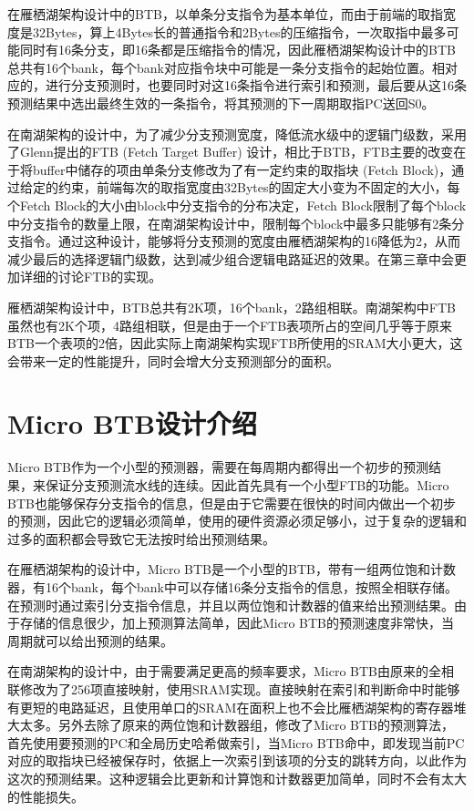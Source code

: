 在雁栖湖架构设计中的BTB，以单条分支指令为基本单位，而由于前端的取指宽度是32Bytes，算上4Bytes长的普通指令和2Bytes的压缩指令，一次取指中最多可能同时有16条分支，即16条都是压缩指令的情况，因此雁栖湖架构设计中的BTB总共有16个bank，每个bank对应指令块中可能是一条分支指令的起始位置。相对应的，进行分支预测时，也要同时对这16条指令进行索引和预测，最后要从这16条预测结果中选出最终生效的一条指令，将其预测的下一周期取指PC送回S0。

在南湖架构的设计中，为了减少分支预测宽度，降低流水级中的逻辑门级数，采用了Glenn提出的FTB (Fetch Target Buffer) 设计\cite{scalable-frontend}，相比于BTB，FTB主要的改变在于将buffer中储存的项由单条分支修改为了有一定约束的取指块 (Fetch Block)，通过给定的约束，前端每次的取指宽度由32Bytes的固定大小变为不固定的大小，每个Fetch Block的大小由block中分支指令的分布决定，Fetch Block限制了每个block中分支指令的数量上限，在南湖架构设计中，限制每个block中最多只能够有2条分支指令。通过这种设计，能够将分支预测的宽度由雁栖湖架构的16降低为2，从而减少最后的选择逻辑门级数，达到减少组合逻辑电路延迟的效果。在第三章中会更加详细的讨论FTB的实现。

雁栖湖架构设计中，BTB总共有2K项，16个bank，2路组相联。南湖架构中FTB虽然也有2K个项，4路组相联，但是由于一个FTB表项所占的空间几乎等于原来BTB一个表项的2倍，因此实际上南湖架构实现FTB所使用的SRAM大小更大，这会带来一定的性能提升，同时会增大分支预测部分的面积。

\section{Micro BTB设计介绍}

Micro BTB作为一个小型的预测器，需要在每周期内都得出一个初步的预测结果，来保证分支预测流水线的连续。因此首先具有一个小型FTB的功能。Micro BTB也能够保存分支指令的信息，但是由于它需要在很快的时间内做出一个初步的预测，因此它的逻辑必须简单，使用的硬件资源必须足够小，过于复杂的逻辑和过多的面积都会导致它无法按时给出预测结果。

在雁栖湖架构的设计中，Micro BTB是一个小型的BTB，带有一组两位饱和计数器，有16个bank，每个bank中可以存储16条分支指令的信息，按照全相联存储。在预测时通过索引分支指令信息，并且以两位饱和计数器的值来给出预测结果。由于存储的信息很少，加上预测算法简单，因此Micro BTB的预测速度非常快，当周期就可以给出预测的结果。

在南湖架构的设计中，由于需要满足更高的频率要求，Micro BTB由原来的全相联修改为了256项直接映射，使用SRAM实现。直接映射在索引和判断命中时能够有更短的电路延迟，且使用单口的SRAM在面积上也不会比雁栖湖架构的寄存器堆大太多。另外去除了原来的两位饱和计数器组，修改了Micro BTB的预测算法，首先使用要预测的PC和全局历史哈希做索引，当Micro BTB命中，即发现当前PC对应的取指块已经被保存时，依据上一次索引到该项的分支的跳转方向，以此作为这次的预测结果。这种逻辑会比更新和计算饱和计数器更加简单，同时不会有太大的性能损失。

